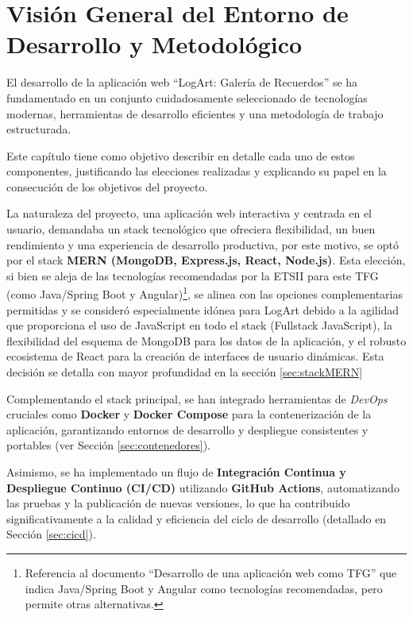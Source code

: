 \section{Visión General del Entorno de Desarrollo y Metodológico}
\label{sec:visionGeneralTecMet}

El desarrollo de la aplicación web ``LogArt: Galería de Recuerdos'' se ha fundamentado en un conjunto cuidadosamente seleccionado de tecnologías modernas, herramientas de desarrollo eficientes y una metodología de trabajo estructurada. 

Este capítulo tiene como objetivo describir en detalle cada uno de estos componentes, justificando las elecciones realizadas y explicando su papel en la consecución de los objetivos del proyecto.

La naturaleza del proyecto, una aplicación web interactiva y centrada en el usuario, demandaba un stack tecnológico que ofreciera flexibilidad, un buen rendimiento y una experiencia de desarrollo productiva, por este motivo, se optó por el stack \textbf{MERN (MongoDB, Express.js, React, Node.js)}. Esta elección, si bien se aleja de las tecnologías recomendadas por la ETSII para este TFG (como Java/Spring Boot y Angular)\footnote{Referencia al documento ``Desarrollo de una aplicación web como TFG'' que indica Java/Spring Boot y Angular como tecnologías recomendadas, pero permite otras alternativas.}, se alinea con las opciones complementarias permitidas y se consideró especialmente idónea para LogArt debido a la agilidad que proporciona el uso de JavaScript en todo el stack (Fullstack JavaScript), la flexibilidad del esquema de MongoDB para los datos de la aplicación, y el robusto ecosistema de React para la creación de interfaces de usuario dinámicas. Esta decisión se detalla con mayor profundidad en la sección \ref{sec:stackMERN}

Complementando el stack principal, se han integrado herramientas de \textit{DevOps} cruciales como \textbf{Docker} y \textbf{Docker Compose} para la contenerización de la aplicación, garantizando entornos de desarrollo y despliegue consistentes y portables (ver Sección \ref{sec:contenedores}).


Asimismo, se ha implementado un flujo de \textbf{Integración Continua y Despliegue Continuo (CI/CD)} utilizando \textbf{GitHub Actions}, automatizando las pruebas y la publicación de nuevas versiones, lo que ha contribuido significativamente a la calidad y eficiencia del ciclo de desarrollo (detallado en Sección \ref{sec:cicd}).

